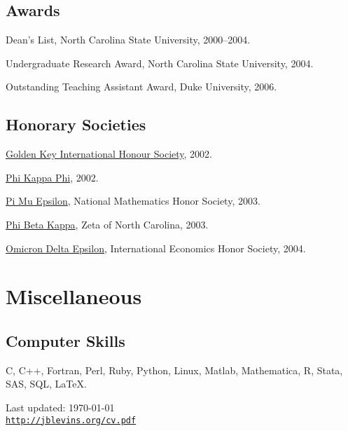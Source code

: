 \documentclass[letterpaper]{article}
\renewenvironment{itemize}{
  \begin{list}{}{
    \setlength{\leftmargin}{1em}
  }
}{
  \end{list}
}
\begin{document}
\subsection*{Awards}

\begin{itemize}
\item Dean's List, North Carolina State University, 2000--2004.
\item Undergraduate Research Award, North Carolina State University, 2004.
\item Outstanding Teaching Assistant Award, Duke University, 2006.
\end{itemize}

\subsection*{Honorary Societies}

\begin{itemize}
\item \href{http://www.goldenkey.org}{Golden Key International
    Honour Society}, 2002.
\item \href{http://www.phikappaphi.org/}{Phi Kappa Phi}, 2002.
\item \href{http://www.pme-math.org/}{Pi Mu Epsilon},
  National Mathematics Honor Society,
  2003.
\item \href{http://www.pbk.org/}{Phi Beta Kappa}, Zeta of North Carolina, 2003.
\item \href{http://www.cba.ua.edu/~ode/}{Omicron Delta Epsilon},
  International Economics Honor Society,
  2004.
\end{itemize}

\section*{Miscellaneous}

\subsection*{Computer Skills}

C, C++, Fortran, Perl, Ruby, Python, Linux,
Matlab, Mathematica, R, Stata, SAS, SQL, \LaTeX.

\bigskip

\begin{center}
\begin{footnotesize}
Last updated: \today \\
\href{http://jblevins.org/cv}{\tt http://jblevins.org/cv.pdf}
\end{footnotesize}
\end{center}
\end{document}
